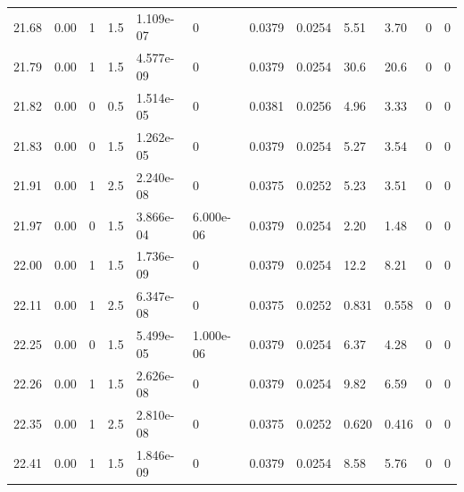 \documentclass[preview]{standalone}
\begin{document}
{{{{{{{\begin{tabular}{L{1.2cm}C{1.2cm} C{0.3cm}C{0.5cm} C{1.4cm}C{1.4cm} C{1.4cm}C{1.4cm} C{1.6cm}C{1.6cm} C{1.6cm}C{1.6cm}}
  21.68  &  0.00  & 1     & 1.5 &  1.109e-07  & 0  &  0.0379&   0.0254& 5.51 & 3.70   &  0 & 0  \\ 
  21.79  &  0.00  & 1     & 1.5 &  4.577e-09  & 0  &  0.0379&   0.0254& 30.6 & 20.6   &  0 & 0  \\ 
  21.82  &  0.00  & 0     & 0.5 &  1.514e-05  & 0  &  0.0381&   0.0256& 4.96 & 3.33   &  0 & 0  \\ 
  21.83  &  0.00  & 0     & 1.5 &  1.262e-05  & 0  &  0.0379&   0.0254& 5.27 & 3.54   &  0 & 0  \\ 
  21.91  &  0.00  & 1     & 2.5 &  2.240e-08  & 0  &  0.0375&   0.0252& 5.23 & 3.51   &  0 & 0  \\ 
  21.97  &  0.00  & 0     & 1.5 &  3.866e-04  & 6.000e-06  &  0.0379&   0.0254& 2.20 & 1.48   &  0 & 0  \\ 
  22.00  &  0.00  & 1     & 1.5 &  1.736e-09  & 0  &  0.0379&   0.0254& 12.2 & 8.21   &  0 & 0  \\ 
  22.11  &  0.00  & 1     & 2.5 &  6.347e-08  & 0  &  0.0375&   0.0252& 0.831 & 0.558   &  0 & 0  \\ 
  22.25  &  0.00  & 0     & 1.5 &  5.499e-05  & 1.000e-06  &  0.0379&   0.0254& 6.37 & 4.28   &  0 & 0  \\ 
  22.26  &  0.00  & 1     & 1.5 &  2.626e-08  & 0  &  0.0379&   0.0254& 9.82 & 6.59   &  0 & 0  \\ 
  22.35  &  0.00  & 1     & 2.5 &  2.810e-08  & 0  &  0.0375&   0.0252& 0.620 & 0.416   &  0 & 0  \\ 
  22.41  &  0.00  & 1     & 1.5 &  1.846e-09  & 0  &  0.0379&   0.0254& 8.58 & 5.76   &  0 & 0  \\ 
\hline 
\end{tabular} 

}}}}}}}
\end{document}
